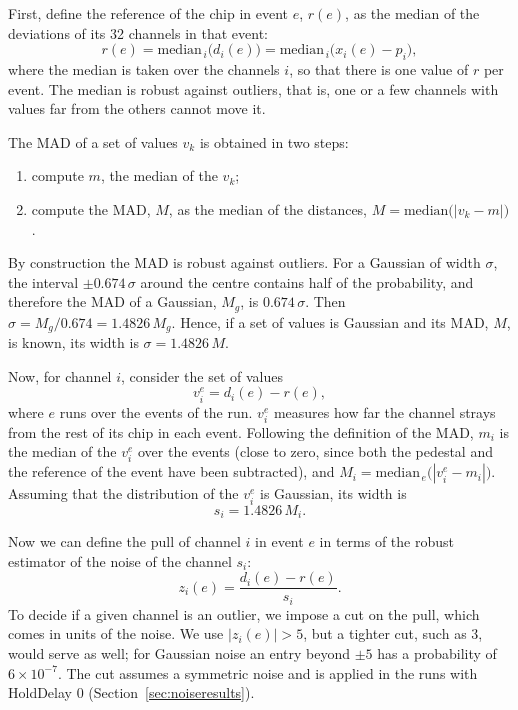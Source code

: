 \documentclass[11pt,a4paper]{article}
\begin{document}
First, define the reference of the chip in event $e$, $r(e)$, as the median of the
deviations of its 32 channels in that event:
\begin{equation*}
r(e) = \mathrm{median}_{\,i}\big(d_i(e)\big) = \mathrm{median}_{\,i}\big(x_i(e) - p_i\big) ,
\end{equation*}
where the median is taken over the channels $i$, so that there is one value of $r$ per
event. The median is robust against outliers, that is, one or a few channels with values far
from the others cannot move it.

The MAD of a set of values $v_k$ is obtained in two steps:
\begin{enumerate}
\item compute $m$, the median of the $v_k$;
\item compute the MAD, $M$, as the median of the distances, $M = \mathrm{median}\big(|v_k - m|\big)$.
\end{enumerate}
By construction the MAD is robust against outliers.
%
For a Gaussian of width $\sigma$, the interval $\pm 0.674\,\sigma$ around the centre
contains half of the probability, and therefore the MAD of a Gaussian, $M_g$, is
$0.674\,\sigma$. Then $\sigma = M_g / 0.674 = 1.4826\, M_g$. Hence, if a set of values is
Gaussian and its MAD, $M$, is known, its width is $\sigma = 1.4826\, M$.

Now, for channel $i$, consider the set of values
\begin{equation*}
v_i^e = d_i(e) - r(e) ,
\end{equation*}
where $e$ runs over the events of the run. $v_i^e$ measures how far the channel strays from
the rest of its chip in each event. Following the definition of the MAD, $m_i$ is the median
of the $v_i^e$ over the events (close to zero, since both the pedestal and the reference of
the event have been subtracted), and $M_i = \mathrm{median}_{\,e}\big(|v_i^e - m_i|\big)$.
Assuming that the distribution of the $v_i^e$ is Gaussian, its width is
\begin{equation*}
s_i = 1.4826\, M_i .
\end{equation*}

Now we can define the pull of channel $i$ in event $e$ in terms of the robust estimator of the
noise of the channel $s_i$:
%
\begin{equation*}
z_i(e) = \frac{d_i(e) - r(e)}{s_i} .
\end{equation*}
%
To decide if a given channel is an outlier, we impose a cut on the pull, which comes in units
of the noise. We use $|z_i(e)| > 5$, but a tighter cut, such as 3, would serve as well; for
Gaussian noise an entry beyond $\pm5$ has a probability of $6\times10^{-7}$. The cut assumes a
symmetric noise and is applied in the runs with HoldDelay 0 (Section~\ref{sec:noiseresults}).
\end{document}
